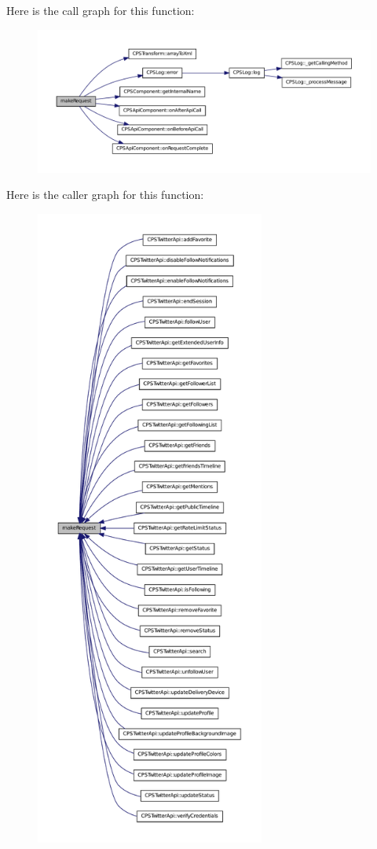 Here is the call graph for this function:\nopagebreak
\begin{figure}[H]
\begin{center}
\leavevmode
\includegraphics[width=400pt]{classCPSOAuthComponent_a48bb515fcba316fcb3d741ce84b57cec_cgraph}
\end{center}
\end{figure}




Here is the caller graph for this function:\nopagebreak
\begin{figure}[H]
\begin{center}
\leavevmode
\includegraphics[height=600pt]{classCPSOAuthComponent_a48bb515fcba316fcb3d741ce84b57cec_icgraph}
\end{center}
\end{figure}


